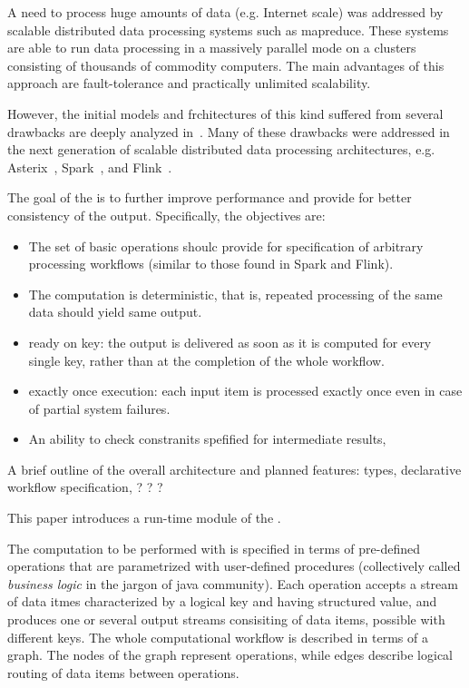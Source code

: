 
\label {fs-intro-seciton}

A need to process huge amounts of data (e.g. Internet scale) was addressed by scalable distributed data processing systems such as  mapreduce. These systems are able to run data processing in a massively parallel mode on a clusters consisting of thousands of commodity computers. The main advantages of this approach are fault-tolerance and practically unlimited scalability.

However, the initial models and frchitectures of this kind suffered from several drawbacks are  deeply analyzed in~\cite{Doulkeridis:2014:SLA:2628707.2628782,}. 
Many of these drawbacks were addressed in the next generation of scalable distributed data processing architectures, e.g. 
Asterix~\cite{Alsubaiee:2012:ASW:2331801.2331803}, 
Spark~\cite{Zaharia:2016:ASU:3013530.2934664,Franklin:2015:MSB:2684822.2685326}, 
and Flink~\cite{Carbone:2017:SMA:3137765.3137777}. 

The goal of the \FlameStream  is to further improve performance and provide for better consistency of the output.  Specifically, the objectives are:

\begin {itemize}
\item  The set of basic operations shoulc provide for specification of arbitrary processing workflows (similar to those found in Spark and Flink). 
\item The computation is deterministic, that is, repeated processing of the same data should yield same output.
\item ready on key: the output is delivered as soon as it is computed for every single key, rather than at the completion of  the whole workflow.
\item exactly once execution: each input item is processed exactly once even in case of partial system failures. 
\item An ability to check constranits spefified for intermediate results, 
\end {itemize}

A brief outline of the overall architecture and planned features: types, declarative workflow specification, ? ? ?

This paper introduces a run-time module of the \FlameStream. 

The computation to be performed with \FlameStream is specified in terms of pre-defined operations that are parametrized with user-defined procedures (collectively called {\em business logic}  in the jargon of java community).  Each operation accepts a stream of data itmes characterized by a logical key and having structured value, and produces one or several output streams consisiting of data items, possible with different keys. The whole computational workflow is described in terms of a graph. The nodes of the graph represent operations, while edges describe logical routing of data items between operations. 

